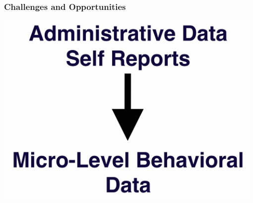 \documentclass[xcolor={table}, fleqn]{beamer}
\newenvironment{changemargin}[2]{%
  \begin{list}{}{%
    \setlength{\topsep}{0pt}%
    \setlength{\leftmargin}{#1}%
    \setlength{\rightmargin}{#2}%
    \setlength{\listparindent}{\parindent}%
    \setlength{\itemindent}{\parindent}%
    \setlength{\parsep}{\parskip}%
  }%
  \item[]}{\end{list}}
\begin{document}
%

\begin{frame}\frametitle{Challenges and Opportunities}
	\LARGE
	\begin{changemargin}{-1cm}{ -1cm}
    \centering
	\includegraphics[width=0.98\textwidth]{images/New_Data.jpg}
	\end{changemargin} 

\end{frame}
\end{document}
